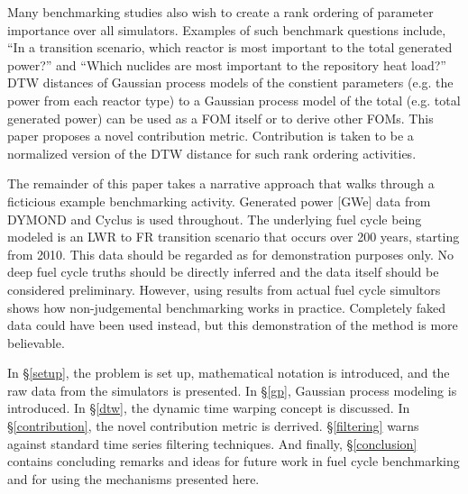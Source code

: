 Many benchmarking studies also wish to create a rank ordering of parameter
importance over all simulators. Examples of such benchmark questions include, 
``In a transition scenario,
which reactor is most important to the total generated power?'' and ``Which
nuclides are most important to the repository heat load?'' DTW distances 
of Gaussian process models of the constient parameters (e.g. the power from
each reactor type) to a Gaussian process model of the total (e.g. total 
generated power) can be used as a FOM itself or to derive other FOMs. 
This paper proposes a novel contribution metric. 
Contribution is taken to be a normalized version of the DTW 
distance for such rank ordering activities.

The remainder of this paper takes a narrative approach that walks through 
a ficticious example benchmarking activity. Generated power [GWe] data 
from DYMOND \cite{yacout2005modeling,feng2015dymond} and Cyclus 
\cite{DBLP:journals/corr/HuffGCFMOSSW15,cyclus_v1_0} is used throughout. 
The underlying fuel cycle being modeled is an
LWR to FR transition scenario that occurs over 200 years, starting from 2010.  
This data should be regarded as for demonstration purposes only. No deep
fuel cycle truths should be directly inferred and the data itself should be 
considered preliminary. However, 
using results from actual fuel cycle simultors shows how
non-judgemental benchmarking works in practice. Completely faked data could 
have been used instead, but this demonstration of the method is more 
believable.

In \S \ref{setup}, the problem is set up, mathematical notation is introduced,
and the raw data from the simulators is presented. In \S \ref{gp}, Gaussian 
process 
modeling is introduced. In \S \ref{dtw}, the dynamic time warping concept is
discussed. In \S \ref{contribution}, the novel contribution metric is 
derrived.
\S \ref{filtering} warns against standard time series filtering
techniques. And finally, \S \ref{conclusion} contains concluding remarks
and ideas for future work in fuel cycle benchmarking and for 
using the mechanisms presented here.
